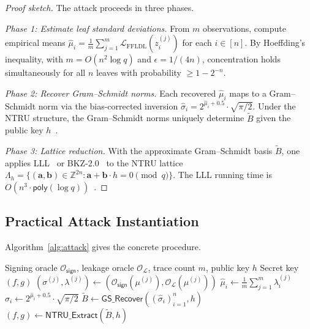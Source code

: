 \documentclass[sigconf,anonymous]{acmart}
\begin{document}
\begin{proof}[Proof sketch]
The attack proceeds in three phases.

\textit{Phase 1: Estimate leaf standard deviations.}
From $m$ observations, compute empirical means
$\hat{\mu}_i = \frac{1}{m}\sum_{j=1}^m \mathcal{L}_{\mathrm{FFLDL}}(z_i^{(j)})$
for each $i\in[n]$.  By Hoeffding's inequality, with $m=O(n^2\log q)$ and
$\epsilon=1/(4n)$, concentration holds simultaneously for all $n$ leaves with
probability $\ge 1-2^{-n}$.

\textit{Phase 2: Recover Gram--Schmidt norms.}
Each recovered $\hat{\mu}_i$ maps to a Gram--Schmidt norm via the
bias-corrected inversion $\hat{\sigma}_i = 2^{\hat{\mu}_i+0.5}\cdot\sqrt{\pi/2}$.
Under the NTRU structure, the Gram--Schmidt norms uniquely determine
$\widetilde{B}$ given the public key $h$~\cite{ducas2016falcon}.

\textit{Phase 3: Lattice reduction.}
With the approximate Gram--Schmidt basis $\widetilde{B}$, one applies
LLL~\cite{lll1982} or BKZ-2.0~\cite{bkz2} to the NTRU lattice
$\Lambda_h = \{(\mathbf{a},\mathbf{b})\in\mathbb{Z}^{2n}: \mathbf{a}+\mathbf{b}\cdot h=0\pmod{q}\}$.
The LLL running time is $O(n^3\cdot\mathsf{poly}(\log q))$~\cite{lll1982}.
\end{proof}

\subsection{Practical Attack Instantiation}

Algorithm~\ref{alg:attack} gives the concrete procedure.

\begin{algorithm}
\caption{\textsc{Lffldl}-based key recovery for Falcon-$n$}
\label{alg:attack}
\begin{algorithmic}[1]
\REQUIRE Signing oracle $\mathcal{O}_{\mathsf{sign}}$, leakage oracle
  $\mathcal{O}_{\mathcal{L}}$, trace count $m$, public key $h$
\ENSURE Secret key $(f,g)$
  \STATE $(\sigma^{(j)},\lambda^{(j)}) \leftarrow
    (\mathcal{O}_{\mathsf{sign}}(\mu^{(j)}),\mathcal{O}_{\mathcal{L}}(\mu^{(j)}))$
\ENDFOR
{}
  \STATE $\hat{\mu}_i \leftarrow \frac{1}{m}\sum_{j=1}^m \lambda_i^{(j)}$
  \STATE $\hat{\sigma}_i \leftarrow 2^{\hat{\mu}_i+0.5}\cdot\sqrt{\pi/2}$
\ENDFOR
\STATE $\widetilde{B} \leftarrow \mathsf{GS\_Recover}((\hat{\sigma}_i)_{i=1}^n, h)$
\RETURN $(f,g) \leftarrow \mathsf{NTRU\_Extract}(\widetilde{B},h)$
\end{algorithmic}
\end{algorithm}
\end{document}
